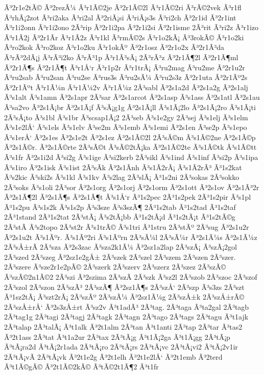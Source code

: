 {Ã³2r1e2tÃ©
Ã³2rezÃ¼
Ã³r1Ã©2je
Ã³2r1Ã©2l
Ã³r1Ã©2ri
Ã³rÃ©2vek
Ã³r1fl
Ã³rhÃ¡2zot
Ã³ri2aka
Ã³ri2al
Ã³2riÃ¡si
Ã³riÃ¡s3s
Ã³ri2ch
Ã³2r1id
Ã³2r1int
Ã³r1i2onn
Ã³r1i2ono
2Ã³rip
Ã³2r1i2pa
Ã³2r1i2si
Ã³2r1isme
2Ã³rit
Ã³ri2z
Ã³r1izo
Ã³r1Ã­2j
Ã³2r1Ã­r
Ã³r1Ã­2z
Ã³r1kl
Ã³rmÃ©2s
Ã³r1o2kÃ¡
Ã³3rokÃ©
Ã³r1o2ki
Ã³ro2kok
Ã³ro2koz
Ã³r1o2ku
Ã³r1okÃº
Ã³2r1osz
Ã³2r1o2x
Ã³2r1Ã³da
Ã³rÃ³2dÃ¡j
Ã³rÃ³i2ko
Ã³rÃ³1p
Ã³r1Ã³sÃ¡
2Ã³rÃ³z
Ã³2r1Ã¶2l
Ã³2r1Ã¶ml
Ã³2r1Ã¶s
Ã³2r1Ã¶t
Ã³r1Å‘r
Ã³r1p2r
Ã³r1trÃ¡
Ã³ru2mag
Ã³ru2me
Ã³2r1u2r
Ã³ru2sab
Ã³ru2san
Ã³ru2se
Ã³rus3s
Ã³ru2sÃ¼
Ã³ru2s3z
Ã³2r1uta
Ã³2r1Ãº2s
Ã³2r1Ãºt
Ã³r1Ã¼n
Ã³r1Ã¼2v
Ã³r1Ã¼z
2Ã³sabl
Ã³2s1a2d
Ã³2s1a2g
Ã³2s1alj
Ã³s1alt
Ã³s1amn
Ã³2s1apr
2Ã³sar
Ã³2s1arcot
Ã³2s1asp
Ã³s1ass
Ã³2s1atl
Ã³2s1au
Ã³sa2vo
Ã³2s1Ã¡br
Ã³2s1Ã¡f
Ã³sÃ¡g1g
Ã³2s1Ã¡ll
Ã³s1Ã¡2lo
Ã³2s1Ã¡2ro
Ã³s1Ã¡ti
2Ã³sÃ¡to
Ã³s1bl
Ã³s1br
Ã³scsap1Ã¡2
2Ã³seb
Ã³s1e2gy
2Ã³sej
Ã³s1elj
Ã³s1elm
Ã³s1e2lÅ‘
Ã³s1els
Ã³s1elv
Ã³se2m
Ã³s1emb
Ã³s1emi
Ã³2s1en
Ã³se2p
Ã³s1epo
Ã³s1erÅ‘
Ã³2s1es
Ã³2s1e2t
Ã³2s1ez
Ã³2s1Ã©2l
2Ã³sÃ©m
Ã³s1Ã©2ne
Ã³2s1Ã©p
Ã³2s1Ã©r.
Ã³2s1Ã©rte
2Ã³sÃ©t
Ã³sÃ©2tÃ¡ka
Ã³2s1Ã©2te
Ã³s1Ã©tk
Ã³s1Ã©tt
Ã³s1fr
Ã³2s1i2d
Ã³si2g
Ã³s1ige
Ã³si2kerb
2Ã³sikl
Ã³s1ind
Ã³s1inf
Ã³si2p
Ã³s1ipa
Ã³s1iro
Ã³2s1isk
Ã³s1ist
2Ã³sÃ­k
Ã³2s1Ã­nh
Ã³s1Ã­2rÃ¡
Ã³s1Ã­2rÃ³
Ã³1s2kat
Ã³s2kic
Ã³ski2s
Ã³s1kl
Ã³s1kv
Ã³s2lag
2Ã³slÃ¡
Ã³1s2ni
2Ã³sokas
2Ã³sokko
2Ã³soks
Ã³s1oli
2Ã³sor
Ã³2s1org
Ã³2s1orj
Ã³2s1orm
Ã³2s1ott
Ã³2s1ov
Ã³2s1Ã³2r
Ã³2s1Ã¶2l
Ã³2s1Ã¶s
Ã³2s1Ã¶t
Ã³s1Å‘r
Ã³1s2pec
2Ã³1s2pek
2Ã³1s2pir
Ã³s1pl
Ã³1s2pu
Ã³s1s2k
Ã³s1s2p
Ã³s3sze
Ã³s3szÃ¶
2Ã³1s2tab
Ã³1s2tad
Ã³1s2taf
2Ã³1stand
2Ã³1s2tat
2Ã³stÃ¡
Ã³s2tÃ¡bb
Ã³1s2tÃ¡d
Ã³1s2tÃ¡t
Ã³1s2tÃ©g
2Ã³stÃ­
Ã³s2topo
2Ã³st2r
Ã³s1trÃ©
Ã³s1tri
Ã³1stru
2Ã³stÃº
2Ã³sug
Ã³2s1u2r
Ã³2s1u2t
Ã³s1Ãºr.
Ã³s1Ãº2ri
Ã³s1Ãºrn
2Ã³sÃ¼l
2Ã³sÃ¼r
Ã³2s1Ã¼s
Ã³2s1Ã¼z
2Ã³sÅ±rÃ­
2Ã³sza
Ã³2s3zac
Ã³sza2k1Ã¼
Ã³2sz1a2lap
2Ã³szÃ¡
Ã³szÃ¡2gol
2Ã³szed
2Ã³szeg
Ã³2sz1e2gÅ±
2Ã³szek
2Ã³szel
2Ã³szem
2Ã³szen
2Ã³szer.
2Ã³szere
Ã³sze2r1e2pÃ©
2Ã³szerk
2Ã³szerv
2Ã³szerz
2Ã³szez
2Ã³szÃ©
Ã³szÃ©2n1Ã©2
2Ã³szi
Ã³2szima
2Ã³szÃ­
2Ã³szk
Ã³sz2l
2Ã³szob
2Ã³szoc
2Ã³szof
2Ã³szol
2Ã³szon
2Ã³szÃ³
2Ã³szÃ¶
Ã³2sz1Ã¶s
2Ã³szÅ‘
2Ã³szp
Ã³s3zs
2Ã³szt
Ã³1sz2tÃ¡
Ã³szt2rÃ¡
2Ã³szÃº
2Ã³szÃ¼
Ã³2sz1Ã¼g
2Ã³szÅ±k
2Ã³szÅ±rÃ©
2Ã³szÅ±rÅ‘
Ã³2s3zÅ±rt
Ã³sz2v
Ã³t1adÃ³
2Ã³tag.
2Ã³taga
Ã³ta2gal
2Ã³tagb
2Ã³tag1g
2Ã³tagi
2Ã³tagj
2Ã³tagk
2Ã³tagn
2Ã³tago
2Ã³tags
2Ã³tagu
Ã³t1ajk
2Ã³talap
2Ã³talÃ¡
Ã³t1alk
Ã³2t1alm
2Ã³tan
Ã³t1anti
2Ã³tap
2Ã³tar
Ã³tas2
Ã³2t1ass
2Ã³tat
Ã³t1a2ur
2Ã³tax
2Ã³tÃ¡g
Ã³t1Ã¡2ga
Ã³t1Ã¡gg
2Ã³tÃ¡p
Ã³tÃ¡ra2d
Ã³tÃ¡2r1ada
2Ã³tÃ¡ro
2Ã³tÃ¡rs
2Ã³tÃ¡vc
2Ã³tÃ¡vi2
Ã³tÃ¡2v1ir
2Ã³tÃ¡vÃ­
2Ã³tÃ¡vk
Ã³2t1e2g
Ã³2t1elh
Ã³2t1e2lÅ‘
Ã³2t1emb
Ã³2terd
Ã³t1Ã©gÃ©
Ã³2t1Ã©2kÃ©
Ã³tÃ©2t1Ã¶2
Ã³t1fr
}
